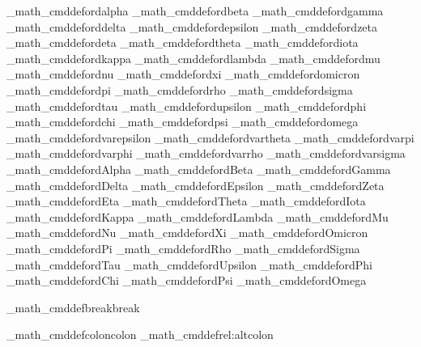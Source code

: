 {%
\brl@document_math_cmddef{ord}{\alpha}{alpha}
\brl@document_math_cmddef{ord}{\beta}{beta}
\brl@document_math_cmddef{ord}{\gamma}{gamma}
\brl@document_math_cmddef{ord}{\delta}{delta}
\brl@document_math_cmddef{ord}{\epsilon}{epsilon}
\brl@document_math_cmddef{ord}{\zeta}{zeta}
\brl@document_math_cmddef{ord}{\eta}{eta}
\brl@document_math_cmddef{ord}{\theta}{theta}
\brl@document_math_cmddef{ord}{\iota}{iota}
\brl@document_math_cmddef{ord}{\kappa}{kappa}
\brl@document_math_cmddef{ord}{\lambda}{lambda}
\brl@document_math_cmddef{ord}{\mu}{mu}
\brl@document_math_cmddef{ord}{\nu}{nu}
\brl@document_math_cmddef{ord}{\xi}{xi}
\brl@document_math_cmddef{ord}{\omicron}{omicron}
\brl@document_math_cmddef{ord}{\pi}{pi}
\brl@document_math_cmddef{ord}{\rho}{rho}
\brl@document_math_cmddef{ord}{\sigma}{sigma}
\brl@document_math_cmddef{ord}{\tau}{tau}
\brl@document_math_cmddef{ord}{\upsilon}{upsilon}
\brl@document_math_cmddef{ord}{\phi}{phi}
\brl@document_math_cmddef{ord}{\chi}{chi}
\brl@document_math_cmddef{ord}{\psi}{psi}
\brl@document_math_cmddef{ord}{\omega}{omega}
\brl@document_math_cmddef{ord}{\varepsilon}{varepsilon}
\brl@document_math_cmddef{ord}{\vartheta}{vartheta}
\brl@document_math_cmddef{ord}{\varpi}{varpi}
\brl@document_math_cmddef{ord}{\varphi}{varphi}
\brl@document_math_cmddef{ord}{\varrho}{varrho}
\brl@document_math_cmddef{ord}{\varsigma}{varsigma}
\brl@document_math_cmddef{ord}{\Alpha}{Alpha}
\brl@document_math_cmddef{ord}{\Beta}{Beta}
\brl@document_math_cmddef{ord}{\Gamma}{Gamma}
\brl@document_math_cmddef{ord}{\Delta}{Delta}
\brl@document_math_cmddef{ord}{\Epsilon}{Epsilon}
\brl@document_math_cmddef{ord}{\Zeta}{Zeta}
\brl@document_math_cmddef{ord}{\Eta}{Eta}
\brl@document_math_cmddef{ord}{\Theta}{Theta}
\brl@document_math_cmddef{ord}{\Iota}{Iota}
\brl@document_math_cmddef{ord}{\Kappa}{Kappa}
\brl@document_math_cmddef{ord}{\Lambda}{Lambda}
\brl@document_math_cmddef{ord}{\Mu}{Mu}
\brl@document_math_cmddef{ord}{\Nu}{Nu}
\brl@document_math_cmddef{ord}{\Xi}{Xi}
\brl@document_math_cmddef{ord}{\Omicron}{Omicron}
\brl@document_math_cmddef{ord}{\Pi}{Pi}
\brl@document_math_cmddef{ord}{\Rho}{Rho}
\brl@document_math_cmddef{ord}{\Sigma}{Sigma}
\brl@document_math_cmddef{ord}{\Tau}{Tau}
\brl@document_math_cmddef{ord}{\Upsilon}{Upsilon}
\brl@document_math_cmddef{ord}{\Phi}{Phi}
\brl@document_math_cmddef{ord}{\Chi}{Chi}
\brl@document_math_cmddef{ord}{\Psi}{Psi}
\brl@document_math_cmddef{ord}{\Omega}{Omega}


\brl@document_math_cmddef{break}{\BrailleBreak}{break}

\brl@document_math_cmddef{colon}{\colon}{colon}
\brl@document_math_cmddef{rel}{:}{altcolon}

}
